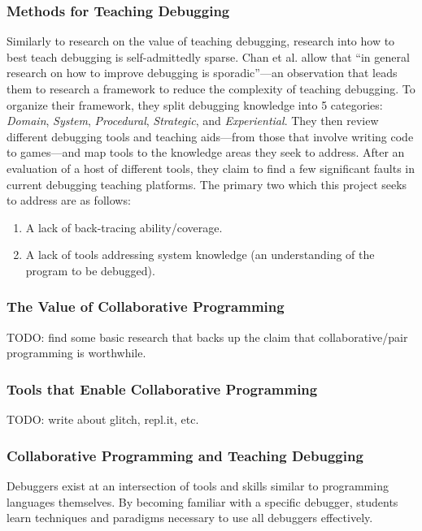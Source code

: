 \documentclass[12pt]{article}
\begin{document}
\subsubsection{Methods for Teaching Debugging}

Similarly to research on the value of teaching debugging, research
into how to best teach debugging is self-admittedly sparse.  Chan et
al. allow that ``in general research on how to improve debugging is
sporadic''---an observation that leads them to research a framework to
reduce the complexity of teaching
debugging\cite{10.1145/3286960.3286970}.  To organize their framework,
they split debugging knowledge into 5 categories: \textit{Domain},
\textit{System}, \textit{Procedural}, \textit{Strategic}, and
\textit{Experiential}.  They then review different debugging tools and
teaching aids---from those that involve writing code to games---and
map tools to the knowledge areas they seek to address.  After an
evaluation of a host of different tools, they claim to find a few
significant faults in current debugging teaching platforms. The
primary two which this project seeks to address are as follows:

\begin{enumerate}
\item A lack of back-tracing ability/coverage.
\item A lack of tools addressing system knowledge (an understanding of
  the program to be debugged).
\end{enumerate}

\subsubsection{The Value of Collaborative Programming}

TODO: find some basic research that backs up the claim that
collaborative/pair programming is worthwhile.

\subsubsection{Tools that Enable Collaborative Programming}

TODO: write about glitch, repl.it, etc.

\subsubsection{Collaborative Programming and Teaching Debugging}

Debuggers exist at an intersection of tools and skills similar to
programming languages themselves. By becoming familiar with a specific
debugger, students learn techniques and paradigms necessary to use all
debuggers effectively.
\end{document}
